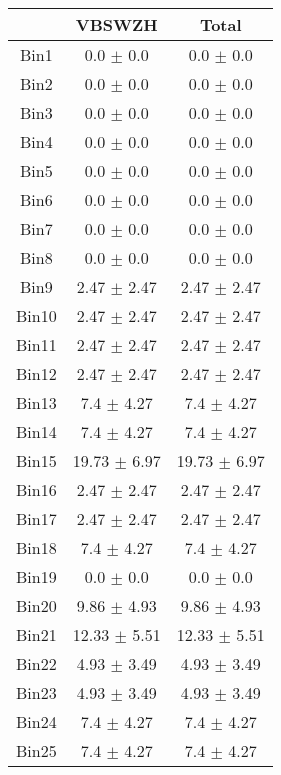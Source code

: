   \begin{tabular}{|c|c|c|}
  \hline
      & VBSWZH & Total \\ \cline{1-3} 
     \hline\hline
     Bin1 & 0.0 $\pm$ 0.0 & 0.0 $\pm$ 0.0 \\ \cline{1-3} 
     Bin2 & 0.0 $\pm$ 0.0 & 0.0 $\pm$ 0.0 \\ \cline{1-3} 
     Bin3 & 0.0 $\pm$ 0.0 & 0.0 $\pm$ 0.0 \\ \cline{1-3} 
     Bin4 & 0.0 $\pm$ 0.0 & 0.0 $\pm$ 0.0 \\ \cline{1-3} 
     Bin5 & 0.0 $\pm$ 0.0 & 0.0 $\pm$ 0.0 \\ \cline{1-3} 
     Bin6 & 0.0 $\pm$ 0.0 & 0.0 $\pm$ 0.0 \\ \cline{1-3} 
     Bin7 & 0.0 $\pm$ 0.0 & 0.0 $\pm$ 0.0 \\ \cline{1-3} 
     Bin8 & 0.0 $\pm$ 0.0 & 0.0 $\pm$ 0.0 \\ \cline{1-3} 
     Bin9 & 2.47 $\pm$ 2.47 & 2.47 $\pm$ 2.47 \\ \cline{1-3} 
     Bin10 & 2.47 $\pm$ 2.47 & 2.47 $\pm$ 2.47 \\ \cline{1-3} 
     Bin11 & 2.47 $\pm$ 2.47 & 2.47 $\pm$ 2.47 \\ \cline{1-3} 
     Bin12 & 2.47 $\pm$ 2.47 & 2.47 $\pm$ 2.47 \\ \cline{1-3} 
     Bin13 & 7.4 $\pm$ 4.27 & 7.4 $\pm$ 4.27 \\ \cline{1-3} 
     Bin14 & 7.4 $\pm$ 4.27 & 7.4 $\pm$ 4.27 \\ \cline{1-3} 
     Bin15 & 19.73 $\pm$ 6.97 & 19.73 $\pm$ 6.97 \\ \cline{1-3} 
     Bin16 & 2.47 $\pm$ 2.47 & 2.47 $\pm$ 2.47 \\ \cline{1-3} 
     Bin17 & 2.47 $\pm$ 2.47 & 2.47 $\pm$ 2.47 \\ \cline{1-3} 
     Bin18 & 7.4 $\pm$ 4.27 & 7.4 $\pm$ 4.27 \\ \cline{1-3} 
     Bin19 & 0.0 $\pm$ 0.0 & 0.0 $\pm$ 0.0 \\ \cline{1-3} 
     Bin20 & 9.86 $\pm$ 4.93 & 9.86 $\pm$ 4.93 \\ \cline{1-3} 
     Bin21 & 12.33 $\pm$ 5.51 & 12.33 $\pm$ 5.51 \\ \cline{1-3} 
     Bin22 & 4.93 $\pm$ 3.49 & 4.93 $\pm$ 3.49 \\ \cline{1-3} 
     Bin23 & 4.93 $\pm$ 3.49 & 4.93 $\pm$ 3.49 \\ \cline{1-3} 
     Bin24 & 7.4 $\pm$ 4.27 & 7.4 $\pm$ 4.27 \\ \cline{1-3} 
     Bin25 & 7.4 $\pm$ 4.27 & 7.4 $\pm$ 4.27 \\ \cline{1-3} 

\end{tabular}
